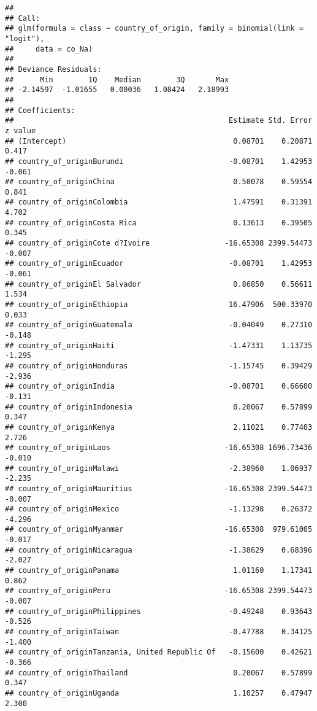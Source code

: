 \documentclass[
]{article}
\begin{document}
\begin{verbatim}
## 
## Call:
## glm(formula = class ~ country_of_origin, family = binomial(link = "logit"), 
##     data = co_Na)
## 
## Deviance Residuals: 
##      Min        1Q    Median        3Q       Max  
## -2.14597  -1.01655   0.00036   1.08424   2.18993  
## 
## Coefficients:
##                                                 Estimate Std. Error z value
## (Intercept)                                      0.08701    0.20871   0.417
## country_of_originBurundi                        -0.08701    1.42953  -0.061
## country_of_originChina                           0.50078    0.59554   0.841
## country_of_originColombia                        1.47591    0.31391   4.702
## country_of_originCosta Rica                      0.13613    0.39505   0.345
## country_of_originCote d?Ivoire                 -16.65308 2399.54473  -0.007
## country_of_originEcuador                        -0.08701    1.42953  -0.061
## country_of_originEl Salvador                     0.86850    0.56611   1.534
## country_of_originEthiopia                       16.47906  500.33970   0.033
## country_of_originGuatemala                      -0.04049    0.27310  -0.148
## country_of_originHaiti                          -1.47331    1.13735  -1.295
## country_of_originHonduras                       -1.15745    0.39429  -2.936
## country_of_originIndia                          -0.08701    0.66600  -0.131
## country_of_originIndonesia                       0.20067    0.57899   0.347
## country_of_originKenya                           2.11021    0.77403   2.726
## country_of_originLaos                          -16.65308 1696.73436  -0.010
## country_of_originMalawi                         -2.38960    1.06937  -2.235
## country_of_originMauritius                     -16.65308 2399.54473  -0.007
## country_of_originMexico                         -1.13298    0.26372  -4.296
## country_of_originMyanmar                       -16.65308  979.61005  -0.017
## country_of_originNicaragua                      -1.38629    0.68396  -2.027
## country_of_originPanama                          1.01160    1.17341   0.862
## country_of_originPeru                          -16.65308 2399.54473  -0.007
## country_of_originPhilippines                    -0.49248    0.93643  -0.526
## country_of_originTaiwan                         -0.47788    0.34125  -1.400
## country_of_originTanzania, United Republic Of   -0.15600    0.42621  -0.366
## country_of_originThailand                        0.20067    0.57899   0.347
## country_of_originUganda                          1.10257    0.47947   2.300

\end{verbatim}
\end{document}
